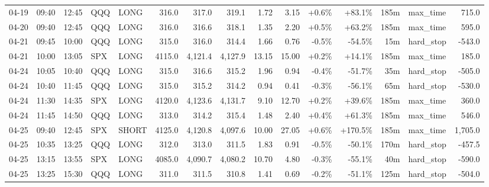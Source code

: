 \documentclass[11pt,a4paper,twoside]{article}
\begin{document}
\begin{landscape}
\begin{center}
\begin{longtable}{>{\color{txtmain}}l l l l l r r r r r r r r >{\color{txtmain}}l r}
04-19 & 09:40 & 12:45 & QQQ & LONG & 316.0 & 317.0 & 319.1 & 1.72 & 3.15 & \textcolor{wingreen}{+0.6\%} & \textcolor{wingreen}{+83.1\%} & 185m & max\_time & \textcolor{wingreen}{715.0} \\
04-20 & 09:40 & 12:45 & QQQ & LONG & 316.0 & 316.6 & 318.1 & 1.35 & 2.20 & \textcolor{wingreen}{+0.5\%} & \textcolor{wingreen}{+63.2\%} & 185m & max\_time & \textcolor{wingreen}{595.0} \\
04-21 & 09:45 & 10:00 & QQQ & LONG & 315.0 & 316.0 & 314.4 & 1.66 & 0.76 & \textcolor{lossred}{-0.5\%} & \textcolor{lossred}{-54.5\%} & 15m & hard\_stop & \textcolor{lossred}{-543.0} \\
04-21 & 10:00 & 13:05 & SPX & LONG & 4115.0 & 4,121.4 & 4,127.9 & 13.15 & 15.00 & \textcolor{wingreen}{+0.2\%} & \textcolor{wingreen}{+14.1\%} & 185m & max\_time & \textcolor{wingreen}{185.0} \\
04-24 & 10:05 & 10:40 & QQQ & LONG & 315.0 & 316.6 & 315.2 & 1.96 & 0.94 & \textcolor{lossred}{-0.4\%} & \textcolor{lossred}{-51.7\%} & 35m & hard\_stop & \textcolor{lossred}{-505.0} \\
04-24 & 10:40 & 11:45 & QQQ & LONG & 315.0 & 315.2 & 314.2 & 0.94 & 0.41 & \textcolor{lossred}{-0.3\%} & \textcolor{lossred}{-56.1\%} & 65m & hard\_stop & \textcolor{lossred}{-530.0} \\
04-24 & 11:30 & 14:35 & SPX & LONG & 4120.0 & 4,123.6 & 4,131.7 & 9.10 & 12.70 & \textcolor{wingreen}{+0.2\%} & \textcolor{wingreen}{+39.6\%} & 185m & max\_time & \textcolor{wingreen}{360.0} \\
04-24 & 11:45 & 14:50 & QQQ & LONG & 313.0 & 314.2 & 315.4 & 1.48 & 2.40 & \textcolor{wingreen}{+0.4\%} & \textcolor{wingreen}{+61.3\%} & 185m & max\_time & \textcolor{wingreen}{546.0} \\
04-25 & 09:40 & 12:45 & SPX & SHORT & 4125.0 & 4,120.8 & 4,097.6 & 10.00 & 27.05 & \textcolor{wingreen}{+0.6\%} & \textcolor{wingreen}{+170.5\%} & 185m & max\_time & \textcolor{wingreen}{1,705.0} \\
04-25 & 10:35 & 13:25 & QQQ & LONG & 312.0 & 313.0 & 311.5 & 1.83 & 0.91 & \textcolor{lossred}{-0.5\%} & \textcolor{lossred}{-50.1\%} & 170m & hard\_stop & \textcolor{lossred}{-457.5} \\
04-25 & 13:15 & 13:55 & SPX & LONG & 4085.0 & 4,090.7 & 4,080.2 & 10.70 & 4.80 & \textcolor{lossred}{-0.3\%} & \textcolor{lossred}{-55.1\%} & 40m & hard\_stop & \textcolor{lossred}{-590.0} \\
04-25 & 13:25 & 15:30 & QQQ & LONG & 311.0 & 311.5 & 310.8 & 1.41 & 0.69 & \textcolor{lossred}{-0.2\%} & \textcolor{lossred}{-51.1\%} & 125m & hard\_stop & \textcolor{lossred}{-504.0} \\

\end{longtable}
\end{center}
\end{landscape}
\end{document}
